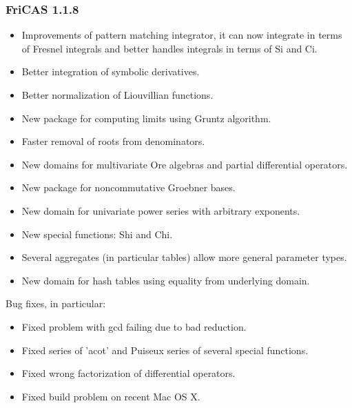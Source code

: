 \subsubsection{FriCAS 1.1.8}

\begin{itemize}
\item Improvements of pattern matching integrator, it can now
  integrate in terms of Fresnel integrals and better handles integrals
  in terms of Si and Ci.

\item Better integration of symbolic derivatives.

\item Better normalization of Liouvillian functions.

\item New package for computing limits using Gruntz algorithm.

\item Faster removal of roots from denominators.

\item New domains for multivariate Ore algebras and partial
  differential operators.

\item New package for noncommutative Groebner bases.

\item New domain for univariate power series with arbitrary exponents.

\item New special functions: Shi and Chi.

\item Several aggregates (in particular tables) allow more general
  parameter types.

\item New domain for hash tables using equality from underlying
  domain.
\end{itemize}

Bug fixes, in particular:

\begin{itemize}
\item Fixed problem with gcd failing due to bad reduction.

\item Fixed series of 'acot' and Puiseux series of several special
  functions.

\item Fixed wrong factorization of differential operators.

\item Fixed build problem on recent Mac OS X.
\end{itemize}

